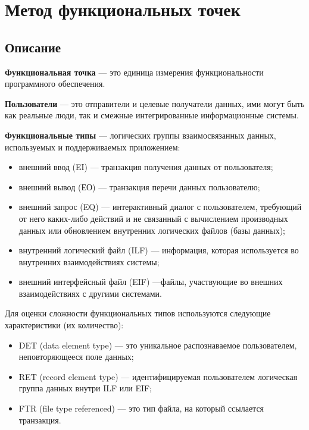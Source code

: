 \section{Метод функциональных точек}

\subsection{Описание}

\textbf{Функциональная точка} --- это единица измерения функциональности программного
обеспечения.

\textbf{Пользователи} --- это отправители и целевые получатели данных, ими могут быть как
реальные люди, так и смежные интегрированные информационные системы.

\textbf{Функциональные типы} — логических группы взаимосвязанных данных, используемых и поддерживаемых приложением:

\begin{itemize}
    \item внешний ввод (EI) --- транзакция получения данных от пользователя;
    \item внешний вывод (ЕО) ---  транзакция перечи данных пользователю;
    \item внешний запрос (EQ) ---  интерактивный диалог с пользователем, требующий от него каких-либо действий и не связанный с вычислением производных данных или обновлением внутренних логических файлов (базы данных);
    \item внутренний логический файл (ILF) --- информация, которая используется во внутренних взаимодействиях системы;
    \item внешний интерфейсный файл (EIF) ---файлы, участвующие во внешних взаимодействиях с другими системами.
\end{itemize}

Для оценки сложности функциональных типов используются следующие характеристики (их количество):

\begin{itemize}
    \item DET (data element type) --- это уникальное распознаваемое пользователем, неповторяющееся поле данных;
    \item RET (record element type) --- идентифицируемая пользователем логическая группа данных внутри ILF или EIF;
    \item FTR (file type referenced) --- это тип файла, на который ссылается транзакция.
\end{itemize}

